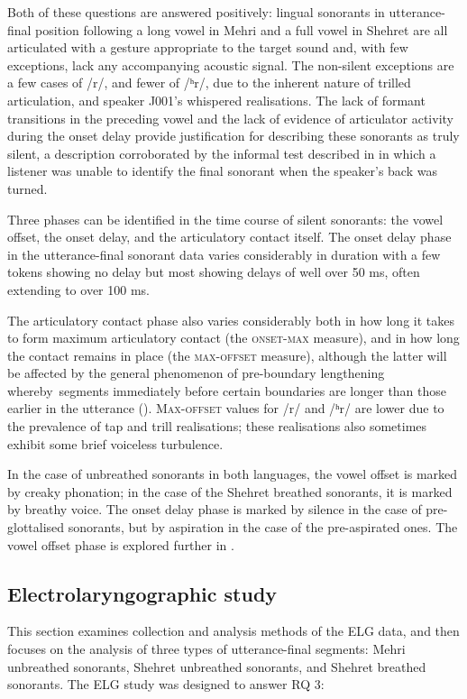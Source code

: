 \documentclass[output=paper]{langscibook}
\begin{document}
Both of these questions are answered positively: lingual sonorants in utterance\hyp final position following a long vowel in Mehri and a full vowel in Shehret are all articulated with a gesture appropriate to the target sound and, with few exceptions, lack any accompanying acoustic signal. The non-silent exceptions are a few cases of \mbox{/r/}, and fewer of \mbox{/ʰr/}, due to the inherent nature of trilled articulation, and speaker J001’s whispered realisations. The lack of formant transitions in the preceding vowel and the lack of evidence of articulator activity during the onset delay provide justification for describing these sonorants as truly silent, a description corroborated by the informal test described in  in which a listener was unable to identify the final sonorant when the speaker’s back was turned.

Three phases can be identified in the time course of silent sonorants: the vowel offset, the onset delay, and the articulatory contact itself. The onset delay phase in the utterance-final sonorant data varies considerably in duration with a few tokens showing no delay but most showing delays of well over 50 ms, often extending to over 100 ms.

The articulatory contact phase also varies considerably both in how long it takes to form maximum articulatory contact (the \textsc{onset-max} measure), and in how long the contact remains in place (the \textsc{max-offset} measure), although the latter will be affected by the general phenomenon of pre-boundary lengthening whereby~segments immediately before certain boundaries are longer than those earlier in the utterance (\citealt{GussenhovenRietveld1992}). \textsc{Max-offset} values for \mbox{/r/} and \mbox{/ʰr/} are lower due to the prevalence of tap and trill realisations; these realisations also sometimes exhibit some brief voiceless turbulence.

In the case of unbreathed sonorants in both languages, the vowel offset is marked by creaky phonation; in the case of the Shehret breathed sonorants, it is marked by breathy voice. The onset delay phase is marked by silence in the case of pre-glottalised sonorants, but by aspiration in the case of the pre-aspirated ones. The vowel offset phase is explored further in .

\subsection{Electrolaryngographic study} %
\label{sec:watson:4.4}
This section examines collection and analysis methods of the ELG data, and then focuses on the analysis of three types of utterance-final segments: Mehri unbreathed sonorants, Shehret unbreathed sonorants, and Shehret breathed sonorants. The ELG study was designed to answer RQ 3:
\end{document}
